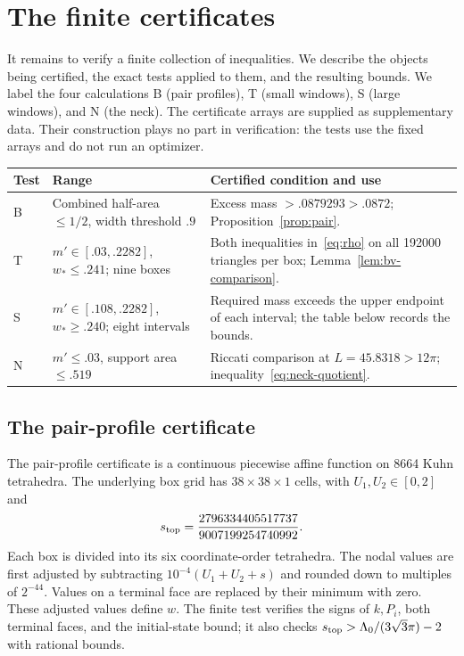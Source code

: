 \section{The finite certificates}\label{sec:cert}
It remains to verify a finite collection of inequalities. We describe the objects being certified, the exact tests applied to them, and the resulting bounds. We label the four calculations B (pair profiles), T (small windows), S (large windows), and N (the neck). The certificate arrays are supplied as supplementary data. Their construction plays no part in verification: the tests use the fixed arrays and do not run an optimizer.

\begin{center}
\begin{tabular}{>{\raggedright\arraybackslash}p{}>{\raggedright\arraybackslash}p{}>{\raggedright\arraybackslash}p{}}\toprule
Test & Range & Certified condition and use\\\midrule
B & Combined half-area $\le1/2$, width threshold $.9$ & Excess mass $>.0879293>.0872$; Proposition~\ref{prop:pair}.\\
T & $m'\in[.03,.2282]$, $w_*\le.241$; nine boxes & Both inequalities in~\eqref{eq:rho} on all 192000 triangles per box; Lemma~\ref{lem:bv-comparison}.\\
S & $m'\in[.108,.2282]$, $w_*\ge.240$; eight intervals & Required mass exceeds the upper endpoint of each interval; the table below records the bounds.\\
N & $m'\le.03$, support area $\le.519$ & Riccati comparison at $L=45.8318>12\pi$; inequality~\eqref{eq:neck-quotient}.\\\bottomrule
\end{tabular}
\end{center}

\subsection{The pair-profile certificate}
The pair-profile certificate is a continuous piecewise affine function on 8664 Kuhn tetrahedra. The underlying box grid has $38\times38\times1$ cells, with $U_1,U_2\in[0,2]$ and
\[
 s_{\rm top}=\frac{2796334405517737}{9007199254740992}.
\]
Each box is divided into its six coordinate-order tetrahedra. The nodal values are first adjusted by subtracting $10^{-4}(U_1+U_2+s)$ and rounded down to multiples of $2^{-44}$. Values on a terminal face are replaced by their minimum with zero. These adjusted values define $w$. The finite test verifies the signs of $k,P_i$, both terminal faces, and the initial-state bound; it also checks $s_{\rm top}>\Lambda_0/(3\sqrt3\pi)-2$ with rational bounds.

